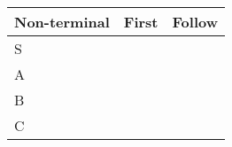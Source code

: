 \begin{tabular}{p{2cm} | p{3cm} | p{3cm}}
	Non-terminal & First & Follow \\
	\hline
	\centering S & & \\
	\centering A & & \\
	\centering B & & \\
	\centering C & & \\
\end{tabular}